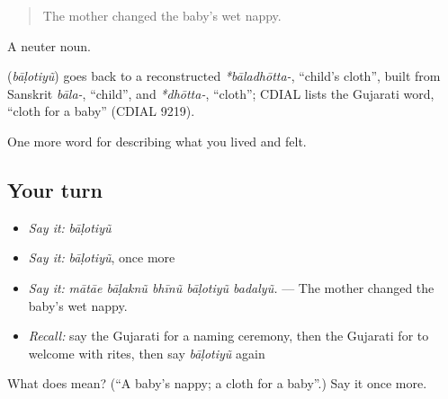 \begin{quote}
The mother changed the baby's wet nappy.
\end{quote}

A neuter noun.

\begin{cousinweb}
\textbf{} (\emph{bāḷotiyũ}) goes back to a reconstructed \emph{*bāladhōtta-}, \textquotedblleft{}child's cloth\textquotedblright{}, built from Sanskrit \emph{bāla-}, \textquotedblleft{}child\textquotedblright{}, and \emph{*dhōtta-}, \textquotedblleft{}cloth\textquotedblright{}; CDIAL lists the Gujarati word, \textquotedblleft{}cloth for a baby\textquotedblright{} (CDIAL 9219).
\end{cousinweb}

\begin{grammarlens}[title={What you've built}]
One more word for describing what you lived and felt.
\end{grammarlens}

\subsection*{Your turn}
\begin{itemize}
\raggedright
  \item \emph{Say it:} \emph{bāḷotiyũ}
  \item \emph{Say it:} \emph{bāḷotiyũ}, once more
  \item \emph{Say it:} \emph{mātāe bāḷaknũ bhīnũ bāḷotiyũ badalyũ.} — The mother changed the baby's wet nappy.
  \item \emph{Recall:} say the Gujarati for a naming ceremony, then the Gujarati for to welcome with rites, then say \emph{bāḷotiyũ} again
\end{itemize}

\begin{tcolorbox}[breakable,colback=teal!4,colframe=teal!35!black,title={Before you move on}]
What does  mean? (\textquotedblleft{}A baby's nappy; a cloth for a baby\textquotedblright{}.) Say it once more.
\end{tcolorbox}
